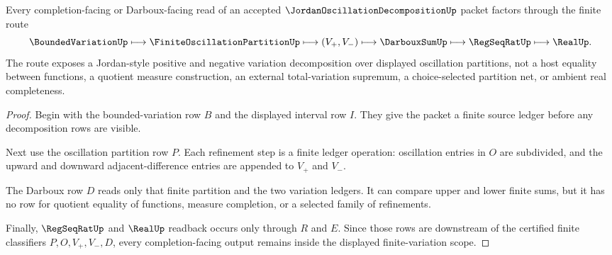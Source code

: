 \begin{theorem}
\label{thm:jordan-oscillation-decomposition-finite-variation-scope}
Every completion-facing or Darboux-facing read of an accepted $\JordanOscillationDecompositionUp$ packet factors through the finite route
$$
\BoundedVariationUp \longmapsto \FiniteOscillationPartitionUp \longmapsto (V_{+},V_{-}) \longmapsto \DarbouxSumUp \longmapsto \RegSeqRatUp \longmapsto \RealUp .
$$
The route exposes a Jordan-style positive and negative variation decomposition over displayed oscillation partitions, not a host equality between functions, a quotient measure construction, an external total-variation supremum, a choice-selected partition net, or ambient real completeness.
\end{theorem}
\begin{proof}
Begin with the bounded-variation row $B$ and the displayed interval row $I$. They give the packet a finite source ledger before any decomposition rows are visible.

Next use the oscillation partition row $P$. Each refinement step is a finite ledger operation: oscillation entries in $O$ are subdivided, and the upward and downward adjacent-difference entries are appended to $V_{+}$ and $V_{-}$.

The Darboux row $D$ reads only that finite partition and the two variation ledgers. It can compare upper and lower finite sums, but it has no row for quotient equality of functions, measure completion, or a selected family of refinements.

Finally, $\RegSeqRatUp$ and $\RealUp$ readback occurs only through $R$ and $E$. Since those rows are downstream of the certified finite classifiers $P,O,V_{+},V_{-},D$, every completion-facing output remains inside the displayed finite-variation scope.
\end{proof}


